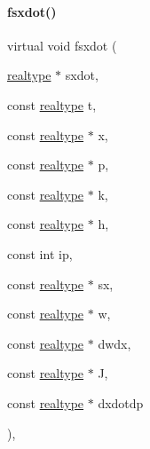 \paragraph{\texorpdfstring{fsxdot()}{fsxdot()}\hspace{0.1cm}{\footnotesize\ttfamily [2/2]}}
{\footnotesize\ttfamily virtual void fsxdot (\begin{DoxyParamCaption}\item[{\mbox{\hyperlink{namespaceamici_a1bdce28051d6a53868f7ccbf5f2c14a3}{realtype}} $\ast$}]{sxdot,  }\item[{const \mbox{\hyperlink{namespaceamici_a1bdce28051d6a53868f7ccbf5f2c14a3}{realtype}}}]{t,  }\item[{const \mbox{\hyperlink{namespaceamici_a1bdce28051d6a53868f7ccbf5f2c14a3}{realtype}} $\ast$}]{x,  }\item[{const \mbox{\hyperlink{namespaceamici_a1bdce28051d6a53868f7ccbf5f2c14a3}{realtype}} $\ast$}]{p,  }\item[{const \mbox{\hyperlink{namespaceamici_a1bdce28051d6a53868f7ccbf5f2c14a3}{realtype}} $\ast$}]{k,  }\item[{const \mbox{\hyperlink{namespaceamici_a1bdce28051d6a53868f7ccbf5f2c14a3}{realtype}} $\ast$}]{h,  }\item[{const int}]{ip,  }\item[{const \mbox{\hyperlink{namespaceamici_a1bdce28051d6a53868f7ccbf5f2c14a3}{realtype}} $\ast$}]{sx,  }\item[{const \mbox{\hyperlink{namespaceamici_a1bdce28051d6a53868f7ccbf5f2c14a3}{realtype}} $\ast$}]{w,  }\item[{const \mbox{\hyperlink{namespaceamici_a1bdce28051d6a53868f7ccbf5f2c14a3}{realtype}} $\ast$}]{dwdx,  }\item[{const \mbox{\hyperlink{namespaceamici_a1bdce28051d6a53868f7ccbf5f2c14a3}{realtype}} $\ast$}]{J,  }\item[{const \mbox{\hyperlink{namespaceamici_a1bdce28051d6a53868f7ccbf5f2c14a3}{realtype}} $\ast$}]{dxdotdp }\end{DoxyParamCaption})\hspace{0.3cm}{\ttfamily [protected]}, {\ttfamily [virtual]}}

